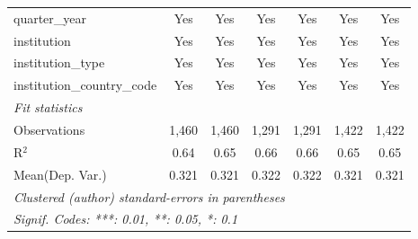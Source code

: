 \begin{tabular}{lcccccc}
   quarter\_year                      & Yes     & Yes     & Yes     & Yes     & Yes     & Yes\\  
   institution                        & Yes     & Yes     & Yes     & Yes     & Yes     & Yes\\  
   institution\_type                  & Yes     & Yes     & Yes     & Yes     & Yes     & Yes\\  
   institution\_country\_code         & Yes     & Yes     & Yes     & Yes     & Yes     & Yes\\  
   \midrule
   \emph{Fit statistics}\\
   Observations                       & 1,460   & 1,460   & 1,291   & 1,291   & 1,422   & 1,422\\  
   R$^2$                              & 0.64    & 0.65    & 0.66    & 0.66    & 0.65    & 0.65\\  
Mean(Dep. Var.) & 0.321 & 0.321 & 0.322 & 0.322 & 0.321 & 0.321 \\
   \midrule \midrule
   \multicolumn{7}{l}{\emph{Clustered (author) standard-errors in parentheses}}\\
   \multicolumn{7}{l}{\emph{Signif. Codes: ***: 0.01, **: 0.05, *: 0.1}}\\
\end{tabular}
\par\endgroup
